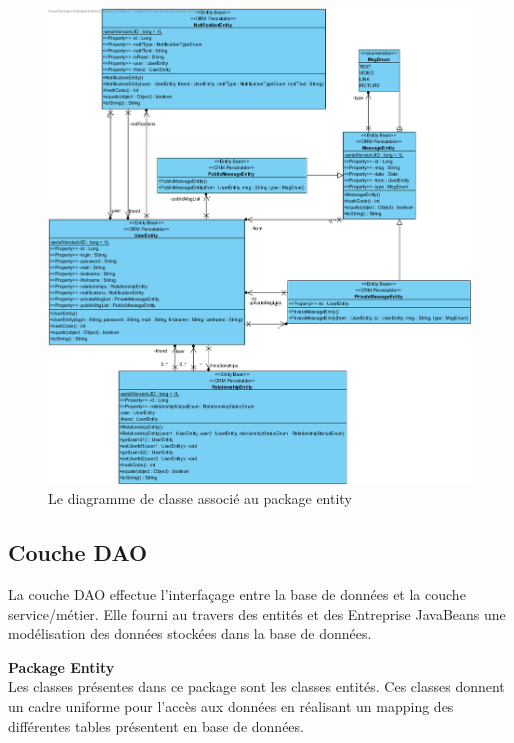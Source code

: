 \documentclass[12pt,a4paper,titlepage]{article}
\begin{document}
\begin{figure}[ht]
	\centering
	\includegraphics[width=13cm]{img/Class_Diagram_Entity.png}
	\caption{Le diagramme de classe associé au package \og{}entity\fg{}}
\end{figure}






\clearpage{\pagestyle{empty}}



\subsection{Couche DAO}
La couche DAO effectue l'interfaçage entre la base de données et la couche service/métier.
Elle fourni au travers des entités et des Entreprise JavaBeans une modélisation des données 
stockées dans la base de données.

\textbf{Package Entity}\\
Les classes présentes dans ce package sont les classes \og{}entités\fg{}. Ces classes 
donnent un cadre uniforme pour l'accès aux données en réalisant un mapping des différentes
tables présentent en base de données.\\
\end{document}
